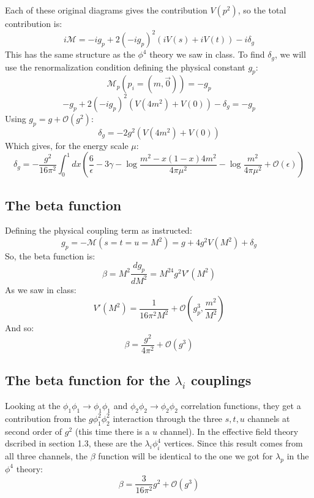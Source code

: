 \documentclass{article}
\begin{document}
Each of these original diagrams gives the contribution $V(p^2)$, so the total contribution is:
\begin{equation}
    i\mathcal{M} = -ig_p + 2(-ig_p)^2\left(iV(s) + iV(t)\right) -i\delta_g
\end{equation}
This has the same structure as the $\phi^4$ theory we saw in class. To find $\delta_g$, we will use the renormalization condition defining the physical constant $g_p$:
\begin{equation}
    \mathcal{M}_p(p_i = (m, \vec{0})) = -g_p
\end{equation}
\begin{equation}
    -g_p + 2(-ig_p)^2\left(V(4m^2) + V(0)\right) -\delta_g = -g_p
\end{equation}
Using $g_p = g + \mathcal{O}(g^2)$:
\begin{equation}
    \delta_g = - 2g^2\left(V(4m^2) + V(0)\right)
\end{equation}
Which gives, for the energy scale $\mu$:
\begin{equation}
    \delta_g = - \frac{g^2}{16\pi^2}\int_0^1 dx \left(
        \frac{6}{\epsilon} - 3\gamma - \log\frac{m^2 - x(1 - x)4m^2}{4\pi\mu^2} - \log\frac{m^2}{4\pi\mu^2} + \mathcal{O}(\epsilon)\right)
\end{equation}
\subsection{The beta function}
Defining the physical coupling term as instructed:
\begin{equation}
    g_p = -\mathcal{M}(s = t = u = M^2) = g + 4g^2V(M^2) + \delta_g
\end{equation}
So, the beta function is:
\begin{equation}
    \beta = M^2 \frac{dg_p}{dM^2} = M^24g^2V'(M^2)
\end{equation}
As we saw in class:
\begin{equation}
    V'(M^2) = \frac{1}{16\pi^2M^2} + \mathcal{O}\left(
        g_p^3, \frac{m^2}{M^2}
    \right)
\end{equation}
And so:
\begin{equation}
    \beta = \frac{g^2}{4\pi^2} + \mathcal{O}(g^3)
\end{equation}
\subsection{The beta function for the $\lambda_i$ couplings}
Looking at the $\phi_1 \phi_1 \rightarrow \phi_1 \phi_1$ and $\phi_2 \phi_2 \rightarrow \phi_2 \phi_2$ correlation functions, they get a contribution from the $g\phi_1^2\phi_2^2$ interaction through the three $s, t, u$ channels at second order of $g^2$ (this time there is a $u$ channel). In the effective field theory dscribed in section 1.3, these are the $\lambda_i\phi_i^4$ vertices. 
Since this result comes from all three channels, the $\beta$ function will be identical to the one we got for $\lambda_p$ in the $\phi^4$ theory:
\begin{equation}
    \beta = \frac{3}{16\pi^2}g^2 + \mathcal{O}(g^3)
\end{equation}
\end{document}
